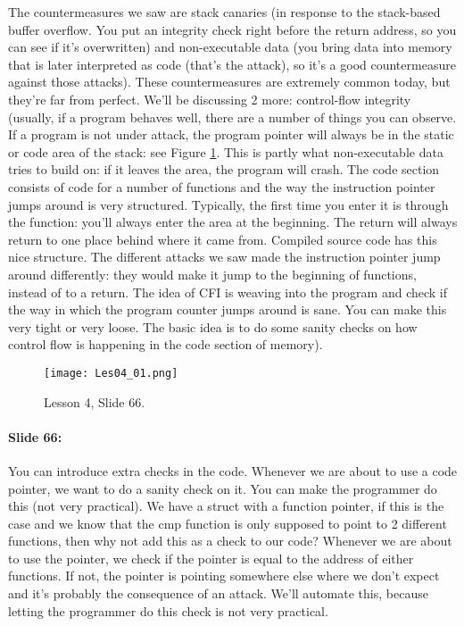 \documentclass[10pt,a4paper]{report}
\begin{document}
The countermeasures we saw are stack canaries (in response to the stack-based buffer overflow. You put an integrity check right before the return address, so you can see if it's overwritten) and non-executable data (you bring data into memory that is later interpreted as code (that's the attack), so it's a good countermeasure against those attacks). These countermeasures are extremely common today, but they're far from perfect. We'll be discussing 2 more: control-flow integrity (usually, if a program behaves well, there are a number of things you can observe. If a program is not under attack, the program pointer will always be in the static or code area of the stack: see Figure \ref{les04_01}. This is partly what non-executable data tries to build on: if it leaves the area, the program will crash. The code section consists of code for a number of functions and the way the instruction pointer jumps around is very structured. Typically, the first time you enter it is through the function: you'll always enter the area at the beginning. The return will always return to one place behind where it came from. Compiled source code has this nice structure. The different attacks we saw made the instruction pointer jump around differently: they would make it jump to the beginning of functions, instead of to a return. The idea of CFI is weaving into the program and check if the way in which the program counter jumps around is sane. You can make this very tight or very loose. The basic idea is to do some sanity checks on how control flow is happening in the code section of memory).

\begin{figure}[ht!]
\centering
\texttt{[image: Les04\_01.png]}
\caption{Lesson 4, Slide 66.} 
\label{les04_01}
\end{figure}

\paragraph{Slide 66:} You can introduce extra checks in the code. Whenever we are about to use a code pointer, we want to do a sanity check on it. You can make the programmer do this (not very practical). We have a struct with a function pointer, if this is the case and we know that the cmp function is only supposed to point to 2 different functions, then why not add this as a check to our code? Whenever we are about to use the pointer, we check if the pointer is equal to the address of either functions. If not, the pointer is pointing somewhere else where we don't expect and it's probably the consequence of an attack. We'll automate this, because letting the programmer do this check is not very practical. 
\end{document}
